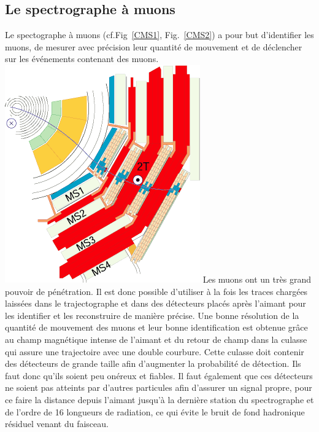 \subsection{Le spectrographe à muons}
\label{RPCPRE}
Le spectographe à muons (cf.Fig~\ref{CMS1}, Fig.~\ref{CMS2}) a pour but d'identifier les muons, de mesurer avec précision leur quantité de mouvement et de déclencher sur les événements contenant des muons.
\marginpar
{
	\centering
	\includegraphics[width=\marginparwidth]{CMS/MUON.png}
	\label{MUON}
} Les muons ont un très grand pouvoir de pénétration. Il est donc possible d'utiliser à la fois les traces chargées laissées dans le trajectographe et dans des détecteurs placés après l'aimant pour les identifier et les reconstruire de manière précise. Une bonne résolution de la quantité de mouvement des muons et leur bonne identification est obtenue grâce au champ magnétique intense de l'aimant et du retour de champ dans la culasse qui assure une trajectoire avec une double courbure. Cette culasse doit contenir des détecteurs de grande taille afin d'augmenter la probabilité de détection. Ils faut donc qu'ils soient peu onéreux et fiables. Il faut également que ces détecteurs ne soient pas atteints par d'autres particules afin d'assurer un signal propre, pour ce faire la distance depuis l'aimant jusqu'à la dernière station du spectrographe et de l'ordre de \num{16} longueurs de radiation, ce qui évite le bruit de fond hadronique résiduel venant du faisceau.

